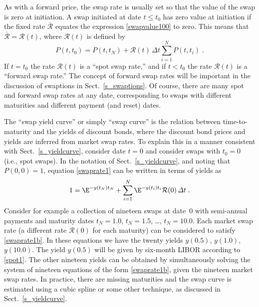 As with a forward price, the swap rate is usually set so that the value of the swap is zero at initiation.  A swap initiated at date $t \leq t_0$ has zero value at initiation if the fixed rate $\bar{\mathcal{R}}$ equates the expression \eqref{swapvalue100} to zero.  This means that $\bar{\mathcal{R}}=\mathcal{R}(t)$, where $\mathcal{R}(t)$ is defined by
\begin{equation}\label{swaprate1}
P(t,t_0) = P(t,t_N) + \mathcal{R}(t)\,\varDelta t\sum_{i=1}^N P(t,t_i)\;.
\end{equation}
If $t=t_0$ the rate $\mathcal{R}(t)$ is a ``spot swap rate,''  and if $t<t_0$ the rate $\mathcal{R}(t)$ is a ``forward swap rate.''   The concept of forward swap rates will be important in the discussion of swaptions in Sect.~\ref{s_swaptions}.  Of course, there are many spot and forward swap rates at any date, corresponding to swaps with different maturities and different payment (and reset) dates.

The ``swap yield curve'' or simply ``swap curve''  is the relation between time-to-maturity and the yields of discount bonds, where the discount bond prices and yields are inferred from market swap rates.  To explain this in a manner consistent with Sect.~\ref{s_yieldcurve}, consider date $t=0$ and consider swaps with $t_0=0$ (i.e., spot swaps).  In the notation of Sect.~\ref{s_yieldcurve}, and noting that $P(0,0)=1$, equation \eqref{swaprate1} can be written in terms of yields as
\begin{equation}\label{swaprate1b}
1 = \E^{-y(t_N)t_N}  + \sum_{i=1}^N \E^{-y(t_i)t_i}\mathcal{R}(0)\,\varDelta t\; .
\end{equation}
Consider for example a collection of nineteen swaps at date~0 with semi-annual payments and maturity dates $t_N=1.0$, $t_N=1.5$, \ldots, $t_N=10.0$.  Each market swap rate (a different rate $\mathcal{R}(0)$ for each maturity) can be considered to satisfy  \eqref{swaprate1b}.  In these equations we have the twenty yields $y(0.5)$, $y(1.0)$, $y(10.0)$.  The yield $y(0.5)$ will be given by six-month LIBOR according to  \eqref{spot1}.  The other nineteen yields can be obtained by simultaneously solving the system of nineteen equations of the form \eqref{swaprate1b}, given the nineteen market swap rates.  In practice, there are missing maturities and the swap curve is estimated using a cubic spline or some other technique, as discussed in Sect.~\ref{s_yieldcurve}.



